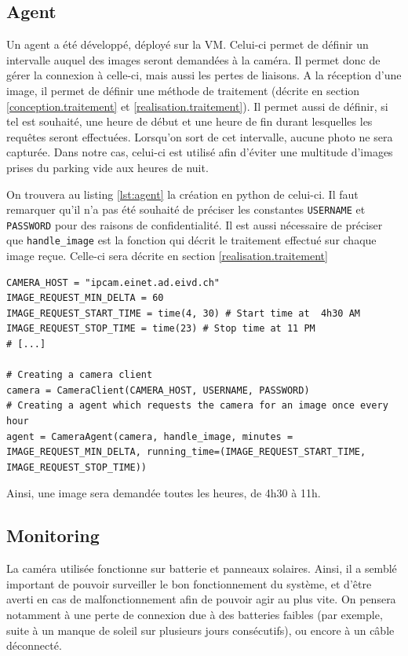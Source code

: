 \subsection{Agent}\label{realisation.capture.agent}
Un agent a été développé, déployé sur la VM. Celui-ci permet de définir un intervalle auquel des images seront demandées à la caméra. Il permet donc de gérer la connexion à celle-ci, mais aussi les pertes de liaisons. A la réception d'une image, il permet de définir une méthode de traitement (décrite en section \ref{conception.traitement} et \ref{realisation.traitement}). 
Il permet aussi de définir, si tel est souhaité, une heure de début et une heure de fin durant lesquelles les requêtes seront effectuées. Lorsqu'on sort de cet intervalle, aucune photo ne sera capturée. Dans notre cas, celui-ci est utilisé afin d'éviter une multitude d'images prises du parking vide aux heures de nuit.

On trouvera au listing \ref{lst:agent} la création en python de celui-ci. Il faut remarquer qu'il n'a pas été souhaité de préciser les constantes \lstinline[columns=fixed]{USERNAME} et \lstinline[columns=fixed]{PASSWORD} pour des raisons de confidentialité. Il est aussi nécessaire de préciser que \lstinline[columns=fixed]{handle_image} est la fonction qui décrit le traitement effectué sur chaque image reçue. Celle-ci sera décrite en section \ref{realisation.traitement}

\begin{lstlisting}[caption={Création d'un agent récupérant les images}, label={lst:agent}] 
CAMERA_HOST = "ipcam.einet.ad.eivd.ch"
IMAGE_REQUEST_MIN_DELTA = 60
IMAGE_REQUEST_START_TIME = time(4, 30) # Start time at  4h30 AM
IMAGE_REQUEST_STOP_TIME = time(23) # Stop time at 11 PM
# [...]

# Creating a camera client
camera = CameraClient(CAMERA_HOST, USERNAME, PASSWORD)
# Creating a agent which requests the camera for an image once every hour
agent = CameraAgent(camera, handle_image, minutes = IMAGE_REQUEST_MIN_DELTA, running_time=(IMAGE_REQUEST_START_TIME, IMAGE_REQUEST_STOP_TIME))
\end{lstlisting}

Ainsi, une image sera demandée toutes les heures, de 4h30 à 11h.

\subsection{Monitoring}
La caméra utilisée fonctionne sur batterie et panneaux solaires. Ainsi, il a semblé important de pouvoir surveiller le bon fonctionnement du système, et d'être averti en cas de malfonctionnement afin de pouvoir agir au plus vite. On pensera notamment à une perte de connexion due à des batteries faibles (par exemple, suite à un manque de soleil sur plusieurs jours consécutifs), ou encore à un câble déconnecté.

